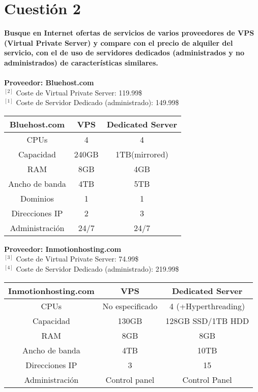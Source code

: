 \documentclass[a4paper, 11pt]{article} %
\begin{document}
\pagebreak 

\section{Cuestión 2}
\textbf{Busque en Internet ofertas de servicios de varios proveedores de VPS (Virtual Private Server) y compare con el precio de alquiler del servicio, con el de uso de servidores dedicados (administrados y no administrados) de características similares.}\\ \\

\textbf{Proveedor: Bluehost.com}\\
$^{[2]}$ Coste de Virtual Private Server: 119.99\$\\
$^{[1]}$ Coste de Servidor Dedicado (administrado): 149.99\$\\
\begin{table}[h]
	\begin{tabular}{|c|c|c|}
	\hline 
	Bluehost.com & VPS & Dedicated Server \\ 
	\hline 
	CPUs & 4 & 4 \\ 
	\hline 
	Capacidad& 240GB & 1TB(mirrored) \\ 
	\hline 
	RAM & 8GB & 4GB \\ 
	\hline 
	Ancho de banda & 4TB & 5TB \\ 
	\hline 
	Dominios & 1 & 1 \\ 
	\hline 
	Direcciones IP & 2 & 3 \\ 
	\hline 
	Administración & 24/7 & 24/7 \\ 
	\hline 
	\end{tabular}
\end{table} 

\textbf{Proveedor: Inmotionhosting.com}\\
$^{[3]}$ Coste de Virtual Private Server: 74.99\$\\
$^{[4]}$ Coste de Servidor Dedicado (administrado): 219.99\$\\
\begin{table}[h]
	\begin{tabular}{|c|c|c|}
	\hline 
	Inmotionhosting.com & VPS & Dedicated Server \\ 
	\hline 
	CPUs & No especificado & 4 (+Hyperthreading) \\ 
	\hline 
	Capacidad& 130GB & 128GB SSD/1TB HDD \\ 
	\hline 
	RAM & 8GB & 8GB \\ 
	\hline 
	Ancho de banda & 4TB & 10TB \\ 
	\hline 
	Direcciones IP & 3 & 15 \\ 
	\hline 
	Administración & Control panel & Control Panel \\ 
	\hline 
	\end{tabular}
\end{table} 
\end{document}
